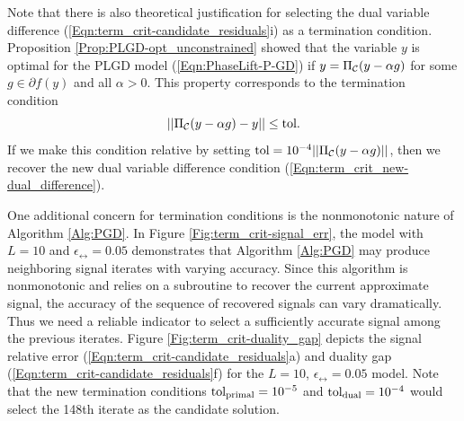 Note that there is also theoretical justification for selecting the dual variable difference (\ref{Eqn:term_crit-candidate_residuals}i) as a termination condition.  Proposition \ref{Prop:PLGD-opt_unconstrained} showed that the variable $y$ is optimal for the PLGD model (\ref{Eqn:PhaseLift-P-GD}) if $y = \Pi_{\mathcal C}(y - \alpha g)$ for some $g \in \partial f(y)$ and all $\alpha > 0$.  This property corresponds to the termination condition 
\begin{equation*}
|| \Pi_{\mathcal C}(y - \alpha g) - y || \leq \text{tol}.
\end{equation*}
If we make this condition relative by setting $\text{tol} = 10^{-4}||\Pi_{\mathcal C}(y - \alpha g)||$, then we recover the new dual variable difference condition (\ref{Eqn:term_crit_new-dual_difference}).






One additional concern for termination conditions is the nonmonotonic nature of Algorithm \ref{Alg:PGD}.  In Figure \ref{Fig:term_crit-signal_err}, the model with $L = 10$ and $\epsilon_\rel = 0.05$ demonstrates that Algorithm \ref{Alg:PGD} may produce neighboring signal iterates with varying accuracy.  Since this algorithm is nonmonotonic and relies on a subroutine to recover the current approximate signal, the accuracy of the sequence of recovered signals can vary dramatically.  Thus we need a reliable indicator to select a sufficiently accurate signal among the previous iterates.  Figure \ref{Fig:term_crit-duality_gap} depicts the signal relative error (\ref{Eqn:term_crit-candidate_residuals}a) and duality gap (\ref{Eqn:term_crit-candidate_residuals}f) for the $L = 10$, $\epsilon_\rel = 0.05$ model.  Note that the new termination conditions $\textnormal{tol}_\text{primal} = 10^{-5}$ and $\textnormal{tol}_\text{dual} = 10^{-4}$ would select the 148th iterate as the candidate solution.  



